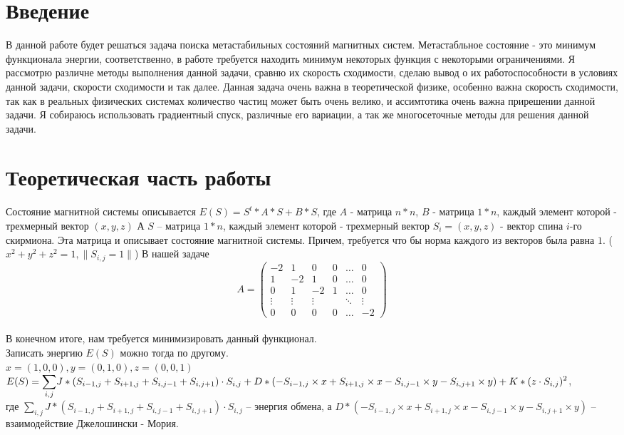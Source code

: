 \documentclass[ 12pt,x11names]{article}
\begin{document}
    \section{Введение}
    В данной работе будет решаться задача поиска метастабильных состояний магнитных систем. Метастабльное состояние - это минимум функционала энергии, соответственно, в работе требуется находить минимум некоторых функция с некоторыми ограничениями. Я рассмотрю различне методы выполнения данной задачи, сравню их скорость сходимости, сделаю вывод о их работоспособности в условиях данной задачи, скорости сходимости и так далее.
    Данная задача очень важна в теоретической физике, особенно важна скорость сходимости, так как в реальных физических системах количество частиц может быть очень велико, и ассимтотика очень важна прирешении данной задачи.
    Я собираюсь использовать градиентный спуск, различные его вариации, а так же многосеточные методы для решения данной задачи.
    \newpage
    \section{Теоретическая часть работы}
    Состояние магнитной системы описывается
    $E(S) = S^t*A*S + B*S$, где $A$ - матрица $n * n$, $B$ - матрица $1 * n$,
    каждый элемент которой - трехмерный вектор $(x, y, z)$
    А $S$ -- матрица $1*n$, каждый элемент которой - трехмерный вектор $S_i = (x, y, z)$ - вектор спина $i$-го скирмиона. Эта матрица и описывает состояние магнитной системы.
    Причем, требуется что бы норма каждого из векторов была равна $1$.
    ($x^2 + y ^ 2 + z ^ 2 = 1, \|S_{i, j} = 1\|$)
    В нашей задаче
    \begin{equation*}
    A = \left(
    \begin{array}{ccccс}
    -2 & 1 & 0 & 0 & \ldots & 0\\
    1 & -2 & 1 & 0 &\ldots & 0\\
    0 & 1 & -2 & 1 &\ldots & 0\\
    \vdots &\vdots &\vdots &  &\ddots & \vdots\\
    0 & 0 &  0&   0 &\ldots & -2
    \end{array}
    \right)
    \end{equation*}\\
    В конечном итоге, нам требуется минимизировать данный функционал.\\
    Записать энергию $E(S)$ можно тогда по другому.\\
    $x = (1,0, 0), y = (0,1, 0), z =(0, 0 , 1)$\\
    $E(S) = \displaystyle{\sum_{i, j}} J* (S_{i - 1, j} + S_{i + 1, j} + S_{i, j - 1} + S_{i, j + 1}) \cdot S_{i,j} + \\
    D * (-S_{i - 1, j} \times x  + S_{i + 1, j} \times x - S_{i, j - 1} \times y - S_{i, j + 1} \times y)
    + \\
    K * (z \cdot S_{i,j}) ^ 2$,\\
    где
    $\displaystyle{\sum_{i, j}} J* (S_{i - 1, j} + S_{i + 1, j} + S_{i, j - 1} + S_{i, j + 1}) \cdot S_{i,j}$ -- энергия обмена, а $D * (-S_{i - 1, j} \times x  + S_{i + 1, j} \times x - S_{i, j - 1} \times y - S_{i, j + 1} \times y)$  -- взаимодействие Джелошински - Мория.
    \newpage
\end{document}
